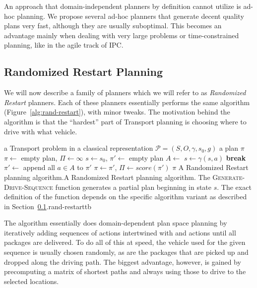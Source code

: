 An approach that domain-independent planners by definition cannot utilize
is ad-hoc planning. We propose several
ad-hoc planners that generate decent quality plans very fast,
although they are usually suboptimal.
This becomes an advantage mainly when dealing with very large
problems or time-constrained planning,
like in the agile track of IPC.

\subsection{Randomized Restart Planning}\label{rand-restart}

We will now describe a family of planners which we will refer to as \textit{Randomized Restart} planners.
Each of these planners essentially performs the same algorithm (Figure~\ref{alg:rand-restart}),
with minor tweaks. The motivation
behind the algorithm is that the ``hardest'' part of Transport planning
is choosing where to drive with what vehicle.

%
{%
\Input a Transport problem in a classical representation $\mathcal{P} = (S, O, \gamma, s_0, g)$
\Output a plan $\pi$
\State $\pi \gets $ empty plan, $\Pi \gets \infty$
 
\State $s \gets s_0$, $\pi' \gets $ empty plan
\State $A \gets $ 
 
\State $s \gets \gamma(s, a)$
\EndFor
{} \textbf{break} 
\EndIf
\State $\pi' \gets $ append all $a \in A$ to $\pi'$
\EndWhile
{}
\State $\pi \gets \pi'$, $\Pi \gets score(\pi')$ 
\EndIf
\EndWhile
\State \Return $\pi$
\EndFunction
}%
{A Randomized Restart planning algorithm.}{A Randomized Restart planning algorithm. The \textsc{Generate-Drive-Sequence} function
generates a partial plan beginning in state $s$.
The exact definition of the function
depends on the specific algorithm variant as described in Section~\ref{rand-restart}.}{rand-restart}{tb}

The algorithm essentially does domain-dependent plan space planning
by iteratively adding sequences of \drive{} actions
intertwined with \pickup{} and \drop{} actions
until all packages are delivered.
To do all of this at speed, the vehicle used for the given sequence
is usually chosen randomly, as are the packages that are picked up and dropped along the driving path.
The biggest advantage, however, is gained by precomputing
a matrix of shortest paths and always using those to drive to the
selected locations.

